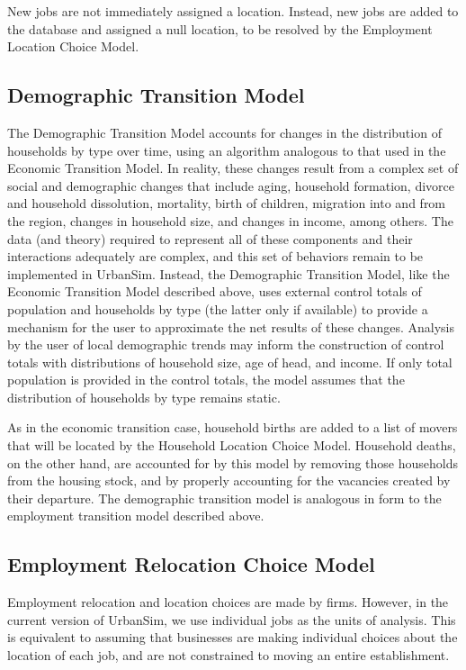 New jobs are not immediately assigned a location.  Instead, new
jobs are added to the database and assigned a null location, to be
resolved by the Employment Location Choice Model.


\subsection{Demographic Transition Model}

The Demographic Transition Model accounts for changes in the
distribution of households by type over time, using an algorithm
analogous to that used in the Economic Transition Model.  In
reality, these changes result from a complex set of social and
demographic changes that include aging, household formation,
divorce and household dissolution, mortality, birth of children,
migration into and from the region, changes in household size, and
changes in income, among others.  The data (and theory) required
to represent all of these components and their interactions
adequately are complex, and this set of behaviors remain to be
implemented in UrbanSim. Instead, the Demographic
Transition Model, like the Economic Transition Model described
above, uses external control totals of population and households
by type (the latter only if available) to provide a mechanism for
the user to approximate the net results of these changes. Analysis
by the user of local demographic trends may inform the
construction of control totals with distributions of household
size, age of head, and income.  If only total population is
provided in the control totals, the model assumes that the
distribution of households by type remains static.

As in the economic transition case, household births are added to
a list of movers that will be located by the Household Location
Choice Model.  Household deaths, on the other hand, are accounted
for by this model by removing those households from the housing
stock, and by properly accounting for the vacancies created by
their departure.  The demographic transition model is analogous in
form to the employment transition model described above.


\subsection{Employment Relocation Choice Model}

Employment relocation and location choices are made by firms.
However, in the current version of UrbanSim, we use individual
jobs as the units of analysis.  This is equivalent to assuming
that businesses are making individual choices about the location
of each job, and are not constrained to moving an entire
establishment.

